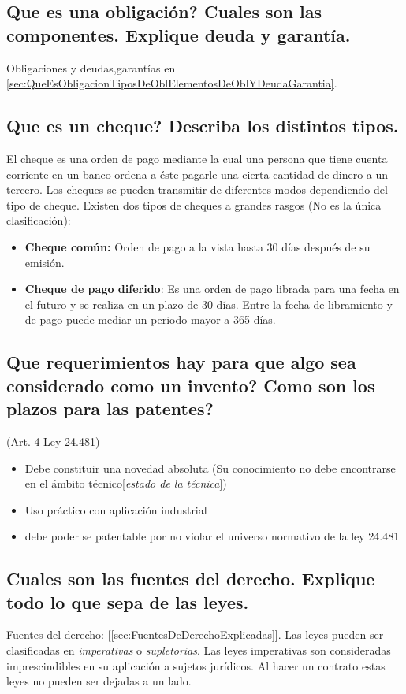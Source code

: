 \documentclass{article}
\begin{document}
\subsection{Que es una obligación? Cuales son las componentes. Explique deuda y garantía.}
Obligaciones y deudas,garantías en \ref{sec:QueEsObligacionTiposDeOblElementosDeOblYDeudaGarantia}.

\subsection{Que es un cheque? Describa los distintos tipos.}
El cheque es una orden de pago mediante la cual una persona que tiene cuenta corriente en un banco ordena a éste pagarle una cierta cantidad de dinero a un tercero. Los cheques se pueden transmitir de diferentes modos dependiendo del tipo de cheque.
Existen dos tipos de cheques a grandes rasgos (No es la única clasificación):
\begin{itemize}
\item \textbf{Cheque común:} Orden de pago a la vista hasta 30 días después de su emisión.
\item \textbf{Cheque de pago diferido}: Es una orden de pago librada para una fecha en el futuro y se realiza en un plazo de 30 días. Entre la fecha de libramiento y de pago puede mediar un periodo mayor a 365 días.
\end{itemize}



\subsection{Que requerimientos hay para que algo sea considerado como un invento? Como son los plazos para las patentes?}
\label{sec:ReqParaConsiderarUnInventoyPlazosPatentes}

(Art. 4 Ley 24.481) 
\begin{itemize}
    \item Debe constituir una novedad absoluta (Su conocimiento no debe encontrarse en el ámbito técnico[\textit{estado de la técnica}])
    \item Uso práctico con aplicación industrial
    \item debe poder se patentable por no violar el universo normativo de la ley 24.481 
\end{itemize}

\subsection{Cuales son las fuentes del derecho. Explique todo lo que sepa de las leyes.}
Fuentes del derecho: [\ref{sec:FuentesDeDerechoExplicadas}]. Las leyes pueden ser clasificadas en \textit{imperativas} o \textit{supletorias}. 
\label{sec:LeyesTodo}
Las leyes imperativas son consideradas imprescindibles en su aplicación a sujetos jurídicos. Al hacer un contrato estas leyes no pueden ser dejadas a un lado.
\end{document}
